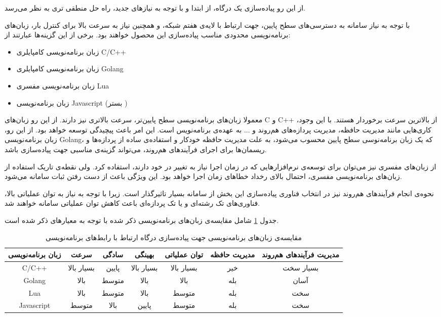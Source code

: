 از این رو پیاده‌سازی یک درگاه، از ابتدا و با توجه به نیاز‌های جدید،‌ راه حل منطقی تری به نظر می‌رسد.

با توجه به نیاز سامانه‌ به دسترسی‌های سطح پایین، جهت ارتباط با لایه‌ی هفتم شبکه، و همچنین نیاز به سرعت بالا برای کنترل بار، زبان‌های برنامه‌نویسی محدودی مناسب پیاده‌سازی این محصول خوا‌هند بود. برخی از این گزینه‌ها عبارتند از:

\begin{itemize}
    \item زبان برنامه‌نویسی کامپایلری C/C++
    \item زبان برنامه‌نویسی کامپایلری Golang
    \item زبان برنامه‌نویسی مفسری Lua
    \item زبان برنامه‌نویسی Javascript (بستر )
\end{itemize}

معمولا زبان‌های برنامه‌نویسی سطح پایین‌تر، سرعت بالاتری نیز دارند. از این رو زبان‌های C و C++ از بالاترین سرعت برخوردار هستند. با این وجود، کاری‌هایی مانند مدیریت حافظه، مدیریت پردازه‌های هم‌روند و ... به عهده‌ی برنامه‌نویس است. این امر باعث پیچیدگی توسعه خواهد بود. از این رو، زبان برنامه‌نویسی Golang، که یک زبان برنامه‌نوسی سطح‌ پایین محسوب می‌شود، به علت مدیریت حافظه خودکار و استفاده‌ی ساده از پردازه‌ها و ریسمان‌ها برای اجرای فرآیند‌های هم‌روند، می‌تواند گزینه‌ی مناسبی جهت پیاده‌سازی باشد.

از زبان‌های مفسری نیز می‌توان برای توسعه‌ی نرم‌افزار‌هایی که در زمان اجرا نیاز به تغییر در خود دارند، استفاده کرد. ولی نقطه‌ی تاریک استفاده ‌از زبان‌های برنامه‌نویسی مفسری، احتمال بالای رخداد خطا‌های زمان اجرا خواهد بود. این ویژگی باعث از دست رفتن ثبات سامانه می‌شود.

نحوه‌ی انجام فرآیند‌های هم‌روند نیز در انتخاب فناوری پیاده‌سازی این بخش از سامانه بسیار تاثیرگذار است. زیرا با توجه به نیاز به توان عملیاتی بالا، فناوری‌های تک رشته‌ای و یا تک‌ پردازه‌ای باعث کاهش توان عملیاتی سامانه خواهند شد.

جدول
\ref{tab:choice}
شامل مقایسه‌ی زبان‌های برنامه‌نویسی ذکر شده با توجه‌ به معیار‌های ذکر شده است.

\begin{table}[H]
    \centering
    \caption{مقایسه‌ی زبان‌های برنامه‌نویسی جهت پیاده‌سازی درگاه ارتباط با رابط‌های برنامه‌نویسی}\label{tab:choice}
    \begin{tabular}{|c|c|c|c|c|c|c|}
        \hline
        زبان برنامه‌نویسی & سرعت & سادگی & بهینگی & توان عملیاتی & مدیریت حافظه & مدیریت فرآیند‌های هم‌روند\\
        \hline
        C/C++ & بسیار بالا & پایین & بسیار بالا & بسیار بالا & خیر & بسیار سخت\\
        \hline
        Golang & بالا & متوسط & بالا & بالا & بله & آسان\\
        \hline
        Lua & بالا & متوسط & بالا & متوسط & بله & سخت\\
        \hline
        Javascript & متوسط & بالا & پایین & متوسط & بله & سخت\\
        \hline
    \end{tabular}

\end{table}



